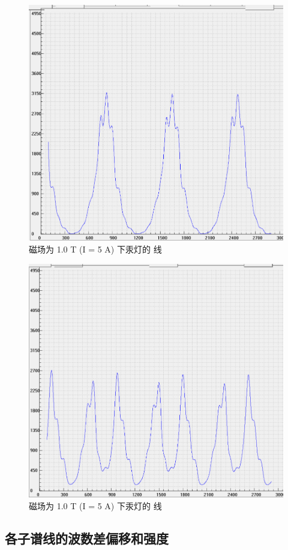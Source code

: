 \documentclass[font=default]{mpltx}
\begin{document}
\begin{figure}[htbp]
  \centering
  \includegraphics[width=0.85\linewidth]{fig/3.png}
  \caption{磁场为 1.0 T (I = 5 A) 下汞灯的 \pi 线}
  \label{fig:551}
\end{figure}
\begin{figure}[htbp]
  \centering
  \includegraphics[width=0.85\linewidth]{fig/4.png}
  \caption{磁场为 1.0 T (I = 5 A) 下汞灯的 \sigma 线}
  \label{fig:552}
\end{figure}

\subsection{各子谱线的波数差偏移和强度}
\end{document}
